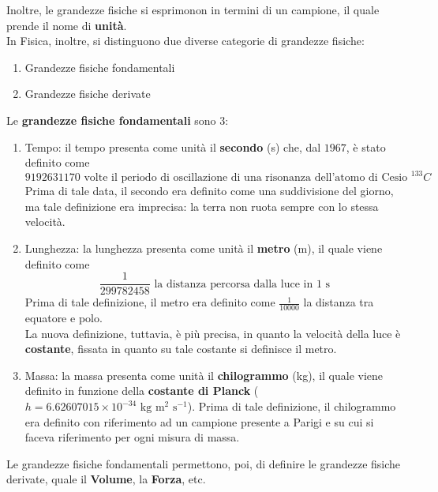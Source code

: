 \documentclass[a4paper]{extarticle}
\begin{document}
\vspace{1em}
\noindent
Inoltre, le grandezze fisiche si esprimonon in termini di un campione, il quale prende il nome di \textbf{unità}.\\
In Fisica, inoltre, si distinguono due diverse categorie di grandezze fisiche:
\begin{enumerate}
  \item Grandezze fisiche fondamentali
  \item Grandezze fisiche derivate
\end{enumerate}
Le \textbf{grandezze fisiche fondamentali} sono $3$:
\begin{enumerate}
  \item Tempo: il tempo presenta come unità il \textbf{secondo} (s) che, dal $1967$, è stato definito come
  \[9192631170 \text{ volte il periodo di oscillazione di una risonanza dell'atomo di Cesio } ^{133}C\]
  Prima di tale data, il secondo era definito come una suddivisione del giorno, ma tale definizione era imprecisa: la terra non ruota sempre con lo stessa velocità.

  \item Lunghezza: la lunghezza presenta come unità il \textbf{metro} (m), il quale viene definito come
  \[\frac{1}{299 782 458} \text{ la distanza percorsa dalla luce in $1$ s}\]
  Prima di tale definizione, il metro era definito come \(\frac{1}{10000}\) la distanza tra equatore e polo.\\
  La nuova definizione, tuttavia, è più precisa, in quanto la velocità della luce è \textbf{costante}, fissata in quanto su tale costante si definisce il metro.

  \item Massa: la massa presenta come unità il \textbf{chilogrammo} (kg), il quale viene definito in funzione della \textbf{costante di Planck} ($h = 6.62607015 \times 10^{-34} \text{ kg} \text{ m}^{2} \text{ s}^{-1}$). Prima di tale definizione, il chilogrammo era definito con riferimento ad un campione presente a Parigi e su cui si faceva riferimento per ogni misura di massa.
\end{enumerate}

\noindent
Le grandezze fisiche fondamentali permettono, poi, di definire le grandezze fisiche derivate, quale il \textbf{Volume}, la \textbf{Forza}, etc.

\vspace{1em}
\end{document}
